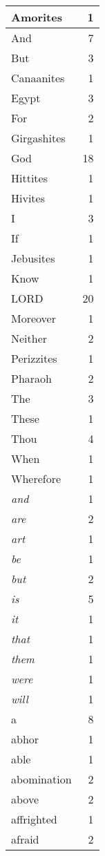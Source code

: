 \begin{center}
\begin{longtable}{l|r}
\hline \hline
\endlastfoot
Amorites & 1 \\ \hline
And & 7 \\ \hline
But & 3 \\ \hline
Canaanites & 1 \\ \hline
Egypt & 3 \\ \hline
For & 2 \\ \hline
Girgashites & 1 \\ \hline
God & 18 \\ \hline
Hittites & 1 \\ \hline
Hivites & 1 \\ \hline
I & 3 \\ \hline
If & 1 \\ \hline
Jebusites & 1 \\ \hline
Know & 1 \\ \hline
LORD & 20 \\ \hline
Moreover & 1 \\ \hline
Neither & 2 \\ \hline
Perizzites & 1 \\ \hline
Pharaoh & 2 \\ \hline
The & 3 \\ \hline
These & 1 \\ \hline
Thou & 4 \\ \hline
When & 1 \\ \hline
Wherefore & 1 \\ \hline
\emph{and} & 1 \\ \hline
\emph{are} & 2 \\ \hline
\emph{art} & 1 \\ \hline
\emph{be} & 1 \\ \hline
\emph{but} & 2 \\ \hline
\emph{is} & 5 \\ \hline
\emph{it} & 1 \\ \hline
\emph{that} & 1 \\ \hline
\emph{them} & 1 \\ \hline
\emph{were} & 1 \\ \hline
\emph{will} & 1 \\ \hline
a & 8 \\ \hline
abhor & 1 \\ \hline
able & 1 \\ \hline
abomination & 2 \\ \hline
above & 2 \\ \hline
affrighted & 1 \\ \hline
afraid & 2 \\ \hline

\end{longtable}
\end{center}
